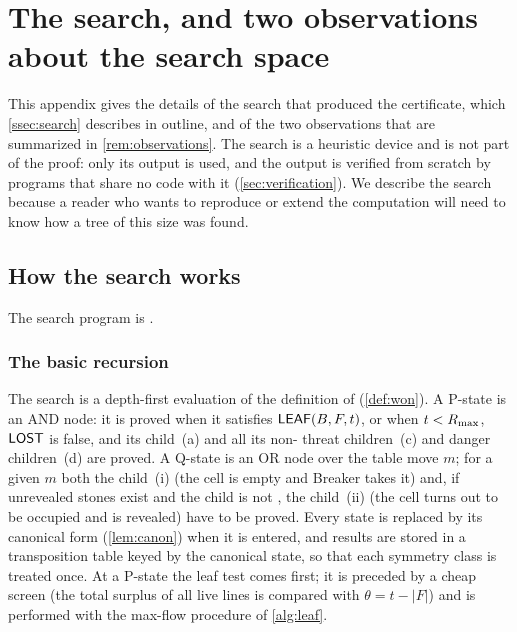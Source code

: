 \section{The search, and two observations about the search space}\label{sec:supp-search}

This appendix gives the details of the search that produced the certificate, which \cref{ssec:search}
describes in outline, and of the two observations that are summarized in \cref{rem:observations}. The
search is a heuristic device and is not part of the proof: only its output is used, and the output is
verified from scratch by programs that share no code with it (\cref{sec:verification}). We describe the
search because a reader who wants to reproduce or extend the computation will need to know how a tree of
this size was found.

\subsection{How the search works}\label{ssec:supp-search-details}

The search program is .

\subsubsection*{The basic recursion}
The search is a depth-first evaluation of the definition of \WON{} (\cref{def:won}). A P-state is an AND
node: it is proved when it satisfies $\mathsf{LEAF}(B,F,t)$, or when $t<R_{\max}$, $\mathsf{LOST}$ is false, and its child~(a)
and all its non-\VOID{} threat children~(c) and danger children~(d) are proved. A Q-state is an OR node over
the table move $m$; for a given $m$ both the child~(i) (the cell is empty and Breaker takes it) and, if
unrevealed stones exist and the child is not \VOID, the child~(ii) (the cell turns out to be occupied and is
revealed) have to be proved. Every state is replaced by its canonical form (\cref{lem:canon}) when it is
entered, and results are stored in a transposition table keyed by the canonical state, so that each
symmetry class is treated once. At a P-state the leaf test comes first; it is preceded by a cheap
screen (the total surplus of all live lines is compared with $\theta=t-|F|$) and is performed with the
max-flow procedure of \cref{alg:leaf}.

